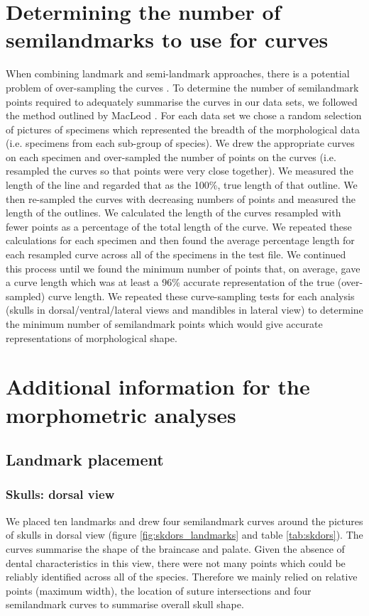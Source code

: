 \documentclass[12pt,a4paper]{article}
\begin{document}
\section{Determining the number of semilandmarks to use for curves}
	When combining landmark and semi-landmark approaches, there is a potential problem of over-sampling the curves \citep{Gunz2013}. To determine the number of semilandmark points required to adequately summarise the curves in our data sets,  we followed the method outlined by MacLeod \citeyearpar{MacLeod2012}. 
	For each data set we chose a random selection of pictures of specimens which represented the breadth of the morphological data (i.e. specimens from each sub-group of species).  We drew the appropriate curves on each specimen and over-sampled the number of points on the curves (i.e. resampled the curves so that points were very close together). 
	We measured the length of the line and regarded that as the 100\%, true length of that outline. We then re-sampled the curves with decreasing numbers of points and measured the length of the outlines. We calculated the length of the curves resampled with fewer points as a percentage of the total length of the curve. We repeated these calculations for each specimen and then found the average percentage length for each resampled curve across all of the specimens in the test file. We continued this process until we found the minimum number of points that, on average, gave a curve length which was at least a 96\% accurate representation of the true (over-sampled) curve length.  
	We repeated these curve-sampling tests for each analysis (skulls in dorsal/ventral/lateral views and mandibles in lateral view) to determine the minimum number of semilandmark points which would give accurate representations of morphological shape.

\section{Additional information for the morphometric analyses}

\subsection{Landmark placement}

\subsubsection{Skulls: dorsal view}
	We placed ten landmarks and drew four semilandmark curves around the pictures of skulls in dorsal view (figure \ref{fig:skdors_landmarks} and table \ref{tab:skdors}). The curves summarise the shape of the braincase and palate.
	Given the absence of dental characteristics in this view, there were not many points which could be reliably identified across all of the species. Therefore we mainly relied on relative points (maximum width), the location of suture intersections and four semilandmark curves to summarise overall skull shape.  
\end{document}

